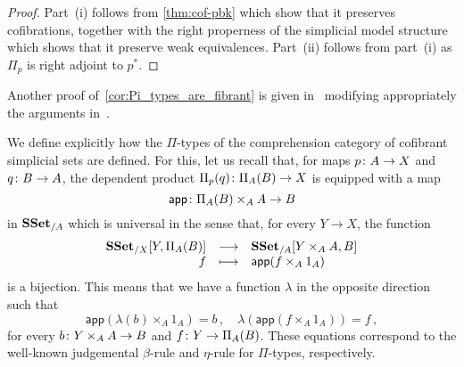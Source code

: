 \documentclass[reqno,10pt,a4paper,oneside,draft]{amsart}
\begin{document}
\begin{proof} Part~(i) follows from \cref{thm:cof-pbk} which show that it preserves cofibrations, together with the right properness of the simplicial model structure which shows that it preserve weak equivalences.
 Part~(ii) follows from part~(i) as $\Pi_p$ is right adjoint to $p^*$.
\end{proof}


Another proof of~\cref{cor:Pi_types_are_fibrant} is given in~\cite{GambinoN:anocp} modifying appropriately
the arguments in~\cite{gambino2017frobenius}.


 
\begin{remark}  \label{rem:pi-types}
We define explicitly how the $\Pi$-types of the comprehension category of cofibrant simplicial sets are defined. For this, let us recall that, for maps $p \colon A \to X$ and $q \colon B \to A$,  the dependent product $\Pi_p(q) \colon \Pi_A(B)
\to X$ is equipped with a map
\[
\mathsf{app} \colon \Pi_A(B) \times_A  A \to B
\] 
in $\mathbf{SSet}_{/A}$ which is universal in the sense that, for every  $Y \to X$, the function
\[
\begin{array}{rcl} 
 \mathbf{SSet}_{/X}[ Y , \Pi_A(B)] & \longrightarrow &  \mathbf{SSet}_{/A}[Y \times_A A, B]  \\
  f & \longmapsto & \mathsf{app}(f \times_A 1_A) 
  \end{array} 
 \]
 is a bijection. This means that we have a function $\lambda$ in the opposite direction such that  
 \begin{equation}
 \label{equ:betaeta}
 \mathsf{app}(\lambda(b) \times_A 1_A) = b   \, , \quad
 \lambda( \mathsf{app}(f \times_A 1_A)) = f \, ,
 \end{equation}
 for every $b \colon Y \times_A A \to B$ and $f \colon Y \to \Pi_A(B)$.  These equations correspond to the
 well-known judgemental $\beta$-rule and $\eta$-rule for $\Pi$-types, respectively.
 

\end{remark}
\end{document}
